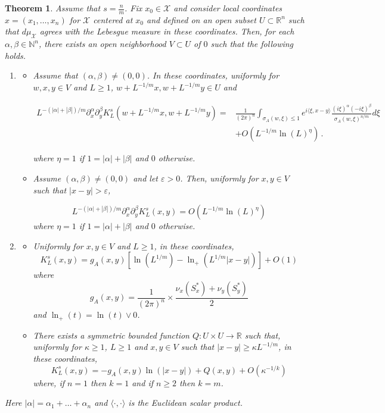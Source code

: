 \documentclass[10pt,twoside]{article}
\newcommand{\eps}{\varepsilon}
\newcommand{\R}{\mathbb{R}}
\newcommand{\N}{\mathbb{N}}
\newcommand{\man}{\mathcal{X}}
\newtheorem{theorem}{Theorem}
\numberwithin{theorem}{section}
\begin{document}
\begin{theorem}\label{t.diff.2}
Assume that $s=\frac{n}{m}$. Fix $x_0\in\man$ and consider local coordinates $x=(x_1,\dots,x_n)$ for $\man$ centered at $x_0$ and defined on an open subset $U\subset\R^n$ such that $d\mu_\man$ agrees with the Lebesgue measure in these coordinates. Then, for each $\alpha,\beta\in\N^n$, there exists an open neighborhood $V\subset U$ of $0$ such that the following holds.

\begin{enumerate}
\item
\begin{itemize}
\item Assume that $(\alpha,\beta)\neq (0,0)$. In these coordinates, uniformly for $w,x,y\in V$ and $L\geq 1$, $w+L^{-1/m}x, w+L^{-1/m}y\in U$ and

\begin{align*}
L^{-(|\alpha|+|\beta|)/m}\partial^\alpha_x\partial^\beta_yK^s_L\left(w+L^{-1/m}x,w+L^{-1/m}y\right)=&\frac{1}{(2\pi)^n}\int_{\sigma_A(w,\xi)\leq 1}e^{i\langle\xi,x-y\rangle}\frac{(i\xi)^\alpha(-i\xi)^\beta}{\sigma_A(w,\xi)^{n/m}} d\xi\\
&+O\left(L^{-1/m}\ln\left(L\right)^\eta\right)\, .
\end{align*}


where $\eta = 1$ if $1=|\alpha|+|\beta|$ and $0$ otherwise.

\item Assume $(\alpha,\beta)\neq (0,0)$ and let $\eps>0$. Then, uniformly for $x,y\in V$ such that $|x-y|>\eps$,

\[
L^{-(|\alpha|+|\beta|)/m}\partial^\alpha_x\partial^\beta_y K^s_L(x,y)=O\left(L^{-1/m}\ln\left(L\right)^\eta\right)
\]
where $\eta = 1$ if $1=|\alpha|+|\beta|$ and $0$ otherwise.

\end{itemize}

\item
\begin{itemize}
\item Uniformly for $x,y\in V$ and $L\geq 1$, in these coordinates,
\[
K^s_L(x,y)=g_A(x,y)\left[\ln\left(L^{1/m}\right)-\ln_+\left(L^{1/m}|x-y|\right)\right]+O(1)
\]
where
\[
g_A(x,y)=\frac{1}{(2\pi)^n}\times\frac{\nu_x\left(S^*_x\right)+\nu_y\left(S^*_y\right)}{2}
\]
and $\ln_+(t)=\ln(t)\vee 0$.
\item There exists a symmetric bounded function $Q: U\times U\rightarrow\R$ such that, uniformly for $\kappa\geq 1$, $L\geq 1$ and $x,y\in V$ such that $|x-y|\geq \kappa L^{-1/m}$, in these coordinates,
\[
K_L^s(x,y)=-g_A(x,y)\ln\left(|x-y|\right)+Q(x,y)+O\left(\kappa^{-1/k}\right)
\]
where, if $n=1$ then $k=1$ and if $n\geq 2$ then $k=m$.
\end{itemize}
\end{enumerate}
Here $|\alpha|=\alpha_1+\dots+\alpha_n$ and $\langle\cdot,\cdot\rangle$ is the Euclidean scalar product.
\end{theorem}
\end{document}
